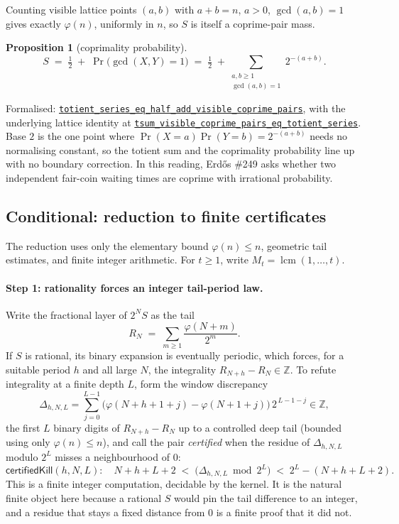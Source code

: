 \documentclass[11pt]{article}
\newcommand{\commit}{81150c1c6fdd4cd51e76d3aa0de344341e0e9e7c}
\newcommand{\repobase}{https://github.com/wcook04/plectis-lean-erdos249-257/blob/\commit}
\newcommand{\PK}{Erdos249257}
\newcommand{\lref}[3]{\href{\repobase/\PK/#1\#L#2}{\nolinkurl{#3}}}
\newcommand{\lrefx}[3]{\href{\repobase/\PK/#1\#L#2}{\nolinkurl{#3}}}
\newtheorem{proposition}[theorem]{Proposition}
\theoremstyle{definition}
\theoremstyle{remark}
\newcommand{\Z}{\mathbb{Z}}
\newcommand{\ph}{\varphi}
\newcommand{\lcm}{\operatorname{lcm}}
\begin{document}
Counting visible lattice points $(a,b)$ with $a+b=n$, $a>0$, $\gcd(a,b)=1$ gives
exactly $\ph(n)$, uniformly in $n$, so $S$ is itself a coprime-pair mass.

\begin{proposition}[coprimality probability]\label{res:coprime}
\[
S \;=\; \tfrac12 \;+\; \Pr\!\big(\gcd(X,Y)=1\big)
\;=\; \tfrac12 \;+\!\!\sum_{\substack{a,b\ge1\\ \gcd(a,b)=1}}\!\! 2^{-(a+b)}.
\]
\end{proposition}
\noindent Formalised: \lref{CertificateKernel.lean}{18229}{totient_series_eq_half_add_visible_coprime_pairs},
with the underlying lattice identity at
\lrefx{CertificateKernel.lean}{18216}{tsum_visible_coprime_pairs_eq_totient_series}.
Base $2$ is the one point where $\Pr(X=a)\Pr(Y=b)=2^{-(a+b)}$ needs no normalising
constant, so the totient sum and the coprimality probability line up with no
boundary correction. In this reading, Erd\H{o}s \#249 asks whether two independent
fair-coin waiting times are coprime with irrational probability.

\subsection{Conditional: reduction to finite certificates}\label{sec:reduction}

The reduction uses only the elementary bound $\ph(n)\le n$, geometric tail
estimates, and finite integer arithmetic.
For $t\ge1$, write $M_t=\lcm(1,\ldots,t)$.

\paragraph{Step 1: rationality forces an integer tail-period law.} Write the
fractional layer of $2^N S$ as the tail
\[
R_N \;=\; \sum_{m\ge1}\frac{\ph(N+m)}{2^m}.
\]
If $S$ is rational, its binary expansion is eventually periodic, which forces, for
a suitable period $h$ and all large $N$, the integrality
$R_{N+h}-R_N\in\Z$. To refute integrality at a finite depth $L$, form the window
discrepancy
\[
\Delta_{h,N,L}=\sum_{j=0}^{L-1}\big(\ph(N+h+1+j)-\ph(N+1+j)\big)\,2^{\,L-1-j}\in\Z,
\]
the first $L$ binary digits of $R_{N+h}-R_N$ up to a controlled deep tail (bounded
using only $\ph(n)\le n$), and call the pair \emph{certified} when the residue of
$\Delta_{h,N,L}$ modulo $2^L$ misses a neighbourhood of $0$:
\[
\textsf{certifiedKill}(h,N,L):\quad
N+h+L+2 \;<\; \big(\Delta_{h,N,L}\bmod 2^L\big) \;<\; 2^L-(N+h+L+2).
\]
This is a finite integer computation, decidable by the kernel. It is the natural
finite object here because a rational $S$ would pin the tail difference to an
integer, and a residue that stays a fixed distance from $0$ is a finite proof that
it did not.
\end{document}
